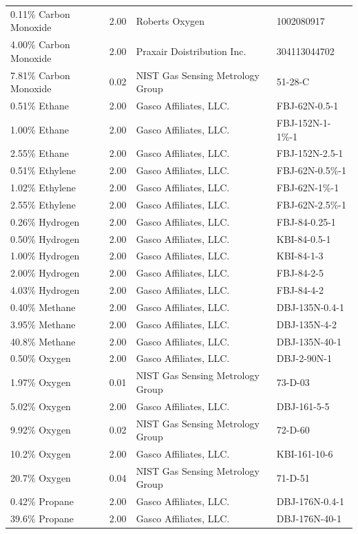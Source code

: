 \documentclass[12pt]{article}
\begin{document}
\begin{table}[h!]
\begin{tabular}{lcll}
0.11\% Carbon Monoxide	&	2.00	&	Roberts Oxygen					&	1002080917			\\
4.00\% Carbon Monoxide	&	2.00	&	Praxair Doistribution Inc. 				&	304113044702		\\
7.81\% Carbon Monoxide	&	0.02	&	NIST Gas Sensing Metrology Group 		&	51-28-C			\\
0.51\% Ethane		&	2.00	&	Gasco Affiliates, LLC.				&	FBJ-62N-0.5-1		\\
1.00\% Ethane		&	2.00	&	Gasco Affiliates, LLC.				&	FBJ-152N-1-1\%-1		\\
2.55\% Ethane		&	2.00	&	Gasco Affiliates, LLC.				&	FBJ-152N-2.5-1		\\
0.51\% Ethylene		&	2.00	&	Gasco Affiliates, LLC.				&	FBJ-62N-0.5\%-1		\\
1.02\% Ethylene		&	2.00	&	Gasco Affiliates, LLC.				&	FBJ-62N-1\%-1		\\
2.55\% Ethylene		&	2.00	&	Gasco Affiliates, LLC.				&	FBJ-62N-2.5\%-1		\\
0.26\% Hydrogen		&	2.00	&	Gasco Affiliates, LLC.				&	FBJ-84-0.25-1		\\
0.50\% Hydrogen		&	2.00	&	Gasco Affiliates, LLC.				&	KBI-84-0.5-1			\\
1.00\% Hydrogen		&	2.00	&	Gasco Affiliates, LLC.				&	KBI-84-1-3			\\
2.00\% Hydrogen		&	2.00	&	Gasco Affiliates, LLC.				&	FBJ-84-2-5			\\
4.03\% Hydrogen		&	2.00	&	Gasco Affiliates, LLC.				&	FBJ-84-4-2			\\
0.40\% Methane		&	2.00	&	Gasco Affiliates, LLC. 				&	DBJ-135N-0.4-1		\\
3.95\% Methane		&	2.00	&	Gasco Affiliates, LLC.				&	DBJ-135N-4-2		\\
40.8\% Methane		&	2.00	&	Gasco Affiliates, LLC.				&	DBJ-135N-40-1		\\
0.50\% Oxygen		&	2.00	&	Gasco Affiliates, LLC. 				&	DBJ-2-90N-1			\\
1.97\% Oxygen		&	0.01	&	NIST Gas Sensing Metrology Group		&	73-D-03			\\
5.02\% Oxygen		&	2.00	&	Gasco Affiliates, LLC.				&	DBJ-161-5-5			\\
9.92\% Oxygen		&	0.02	&	NIST Gas Sensing Metrology Group		&	72-D-60			\\
10.2\% Oxygen		&	2.00	&	Gasco Affiliates, LLC. 				&	KBI-161-10-6		\\
20.7\% Oxygen		&	0.04	&	NIST Gas Sensing Metrology Group		&	71-D-51			\\
0.42\% Propane		&	2.00	&	Gasco Affiliates, LLC.				&	DBJ-176N-0.4-1		\\
39.6\% Propane		&	2.00	&	Gasco Affiliates, LLC. 				&	DBJ-176N-40-1		\\
\hline
\end{tabular}
\end{table}
\end{document}
